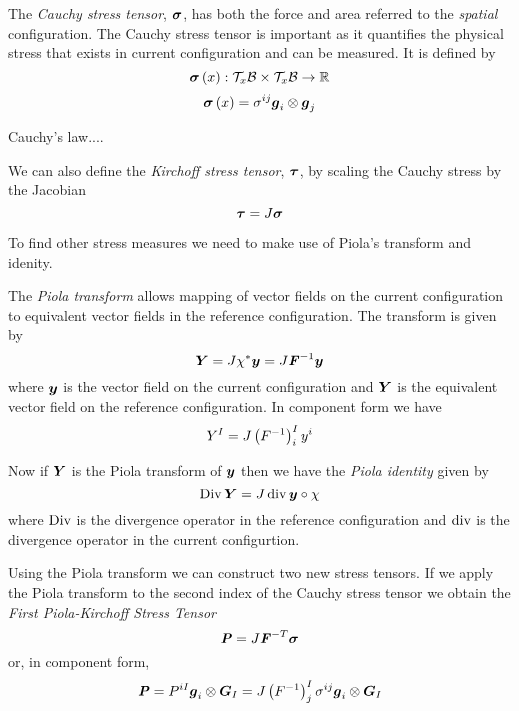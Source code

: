 The \emph{Cauchy stress tensor}, $\tensor{\sigma}$, has both the force and
area referred to the \emph{spatial} configuration. The Cauchy stress tensor is
important as it quantifies the physical stress that exists in current
configuration and can be measured. It is defined by
\begin{equation}
  \mapping{\fnof{\tensor{\sigma}}{x}}{\spaceprod{\tangentspace{\embedmanifold{B}}{x}}{\tangentspace{\embedmanifold{B}}{x}}}{\realnums}
\end{equation}
\ie
\begin{equation}
  \fnof{\tensor{\sigma}}{x}=\sigma^{ij}\tensorprod{\vectr{g}_{i}}{\vectr{g}_{j}}
\end{equation}

Cauchy's law....

We can also define the \emph{Kirchoff stress tensor}, $\tensor{\tau}$, by
scaling the Cauchy stress by the Jacobian \ie{}
\begin{equation}
  \tensor{\tau}=J\tensor{\sigma}
\end{equation}

To find other stress measures we need to make use of Piola's transform and
idenity.

The \emph{Piola transform} allows mapping of vector fields on the current
configuration to equivalent vector fields in the reference configuration. The
transform is given by
\begin{equation}
  \vectr{Y}=J\pullback{\chi}{\vectr{y}}=J\inverse{\tensor{F}}\vectr{y}
\end{equation}
where $\vectr{y}$ is the vector field on the current configuration and
$\vectr{Y}$ is the equivalent vector field on the reference configuration. In
component form we have
\begin{equation}
  Y^{I}=J\pbrac{\inverse{F}}^{I}_{i}y^{i}
\end{equation}

Now if $\vectr{Y}$ is the Piola transform of $\vectr{y}$ then we have the
\emph{Piola identity} given by
\begin{equation}
  \Divop{\vectr{Y}}=J\divop{\circcomposition{\vectr{y}}{\chi}}
\end{equation}
where $\Divop$ is the divergence operator in the reference configuration and
$\divop$ is the divergence operator in the current configurtion. 

Using the Piola transform we can construct two new stress tensors. If we apply
the Piola transform to the second index of the Cauchy stress tensor we obtain
the \emph{First Piola-Kirchoff Stress Tensor} \ie{}
\begin{equation}
  \tensor{P}=J\invtranspose{\tensor{F}}\tensor{\sigma}
\end{equation}
or, in component form,
\begin{equation}
  \tensor{P}=P^{iI}\tensorprod{\vectr{g}_{i}}{\vectr{G}_{I}}=J\pbrac{\inverse{F}}^{I}_{j}\sigma^{ij}\tensorprod{\vectr{g}_{i}}{\vectr{G}_{I}}
\end{equation}

